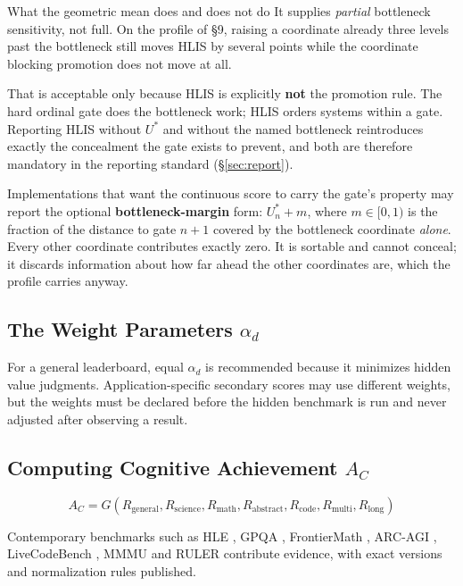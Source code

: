 \begin{cautionbox}{What the geometric mean does and does not do}
It supplies \emph{partial} bottleneck sensitivity, not full. On the profile of \S9, raising a coordinate already three levels past the bottleneck still moves HLIS by several points while the coordinate blocking promotion does not move at all.

That is acceptable only because HLIS is explicitly \textbf{not} the promotion rule. The hard ordinal gate does the bottleneck work; HLIS orders systems within a gate. Reporting HLIS without $U^{*}$ and without the named bottleneck reintroduces exactly the concealment the gate exists to prevent, and both are therefore mandatory in the reporting standard (\S\ref{sec:report}).

Implementations that want the continuous score to carry the gate's property may report the optional \textbf{bottleneck-margin} form: $U^{*}_n + m$, where $m \in [0,1)$ is the fraction of the distance to gate $n{+}1$ covered by the bottleneck coordinate \emph{alone}. Every other coordinate contributes exactly zero. It is sortable and cannot conceal; it discards information about how far ahead the other coordinates are, which the profile carries anyway.
\end{cautionbox}

\subsection{The Weight Parameters \texorpdfstring{$\alpha_d$}{alpha-d}}

\sloppy For a general leaderboard, equal $\alpha_d$ is recommended because it minimizes hidden value judgments. Application-specific secondary scores may use different weights, but the weights must be declared before the hidden benchmark is run and never adjusted after observing a result.

\subsection{Computing Cognitive Achievement \texorpdfstring{$A_C$}{A-C}}

\begin{equation}
A_C = G(R_{\text{general}}, R_{\text{science}}, R_{\text{math}}, R_{\text{abstract}}, R_{\text{code}}, R_{\text{multi}}, R_{\text{long}})
\end{equation}

Contemporary benchmarks such as HLE \citep{phan2025hle}, GPQA \citep{rein2023gpqa}, FrontierMath \citep{glazer2024frontiermath}, ARC-AGI \citep{arc2026}, LiveCodeBench \citep{jain2024livecodebench}, MMMU \citep{yue2023mmmu} and RULER \citep{hsieh2024ruler} contribute evidence, with exact versions and normalization rules published.

